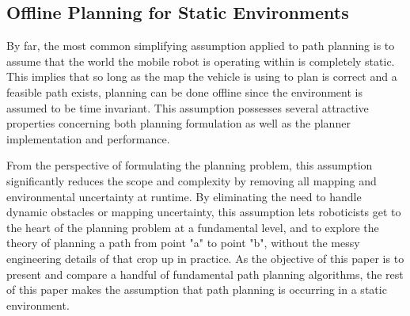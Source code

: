 \subsection{Offline Planning for Static Environments}

By far, the most common simplifying assumption applied to path planning is to assume that the world the mobile robot is operating within is completely static. This implies that so long as the map the vehicle is using to plan is correct and a feasible path exists, planning can be done offline since the environment is assumed to be time invariant. This assumption possesses several attractive properties concerning both planning formulation as well as the planner implementation and performance.

From the perspective of formulating the planning problem, this assumption significantly reduces the scope and complexity by removing all mapping and environmental uncertainty at runtime. By eliminating the need to handle dynamic obstacles or mapping uncertainty, this assumption lets roboticists get to the heart of the planning problem at a fundamental level, and to explore the theory of planning a path from point "a" to point "b", without the messy engineering details of that crop up in practice. As the objective of this paper is to present and compare a handful of fundamental path planning algorithms, the rest of this paper makes the assumption that path planning is occurring in a static environment.